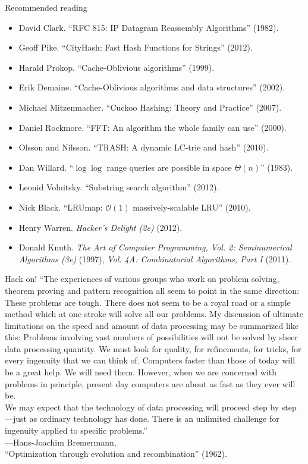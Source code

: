 \documentclass[mathserif,xcolor={dvipsnames,table}]{beamer}
\begin{document}
\begin{frame}{Recommended reading}
\footnotesize{
\begin{itemize}
\item David Clark. ``RFC 815: IP Datagram Reassembly Algorithms'' (1982).
\item Geoff Pike. ``CityHash: Fast Hash Functions for Strings'' (2012).
\item Harald Prokop. ``Cache-Oblivious algorithms'' (1999).
\item Erik Demaine. ``Cache-Oblivious algorithms and data structures'' (2002).
\item Michael Mitzenmacher. ``Cuckoo Hashing: Theory and Practice'' (2007).
\item Daniel Rockmore. ``FFT: An algorithm the whole family can use'' (2000).
\item Olsson and Nilsson. ``TRASH: A dynamic LC-trie and hash'' (2010).
\item Dan Willard. ``$\log\log$ range queries are possible in space $\Theta(n)$'' (1983).
\item Leonid Volnitsky. ``Substring search algorithm'' (2012).
\item Nick Black. ``LRUmap: $\mathcal{O}(1)$ massively-scalable LRU'' (2010).
\item Henry Warren. \textit{Hacker's Delight (2e)} (2012).
\item Donald Knuth. \textit{The Art of Computer Programming, Vol. 2: Seminumerical Algorithms (3e)} (1997),
\textit{Vol. 4A: Combinatorial Algorithms, Part I} (2011).
\end{itemize}
}
\end{frame}

\begin{frame}{Hack on!}
\small{``The experiences of various groups who work on problem solving, theorem
proving and pattern recognition all seem to point in the same direction: These
problems are tough. There does not seem to be a royal road or a simple method
which at one stroke will solve all our problems. My discussion of ultimate
limitations on the speed and amount of data processing may be summarized like
this: Problems involving vast numbers of possibilities will not be solved by
sheer data processing quantity. We must look for quality, for refinements, for
tricks, for every ingenuity that we can think of. Computers faster than those
of today will be a great help. We will need them. However, when we are
concerned with problems in principle, present day computers are about as fast
as they ever will be.\\
\vspace{.1in}
We may expect that the technology of data processing will proceed step by
step---just as ordinary technology has done. There is an unlimited challenge
for ingenuity applied to specific problems.''}\\
\vspace{.1in}
\scriptsize{\hfill---Hans-Joachim Bremermann,\\ \hfill``Optimization through evolution and recombination'' (1962).}
\end{frame}
\end{document}

